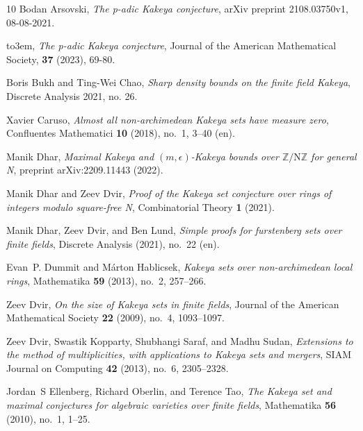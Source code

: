 \documentclass[11pt]{article}
\numberwithin{equation}{section}
\begin{document}
\begin{thebibliography}{10}
\providecommand{\bysame}{\leavevmode\hbox to3em{\hrulefill}\thinspace}
\providecommand{\MR}{\relax\ifhmode\unskip\space\fi MR }
\providecommand{\MRhref}[2]{%
  \href{http://www.ams.org/mathscinet-getitem?mr=#1}{#2}
}
\providecommand{\href}[2]{#2}
Bodan Arsovski, \emph{The p-adic {K}akeya conjecture}, arXiv preprint
  2108.03750v1, 08-08-2021.

\bysame, \emph{The p-adic {K}akeya conjecture}, Journal of the American Mathematical Society, \textbf{37} (2023), 69-80.



Boris Bukh and Ting-Wei Chao, \emph{Sharp density bounds on the finite field
  {K}akeya}, Discrete Analysis 2021, no. 26.

Xavier Caruso, \emph{Almost all non-archimedean {K}akeya sets have measure
  zero}, Confluentes Mathematici \textbf{10} (2018), no.~1, 3--40 (en).

Manik Dhar, \emph{{Maximal Kakeya and $(m,\epsilon)$-Kakeya bounds over
  $\mathbb{Z}/\text{{N}}\mathbb{Z}$ for general N}}, preprint arXiv:2209.11443
  (2022).

Manik Dhar and Zeev Dvir, \emph{Proof of the {K}akeya set conjecture over rings
  of integers modulo square-free {N}}, Combinatorial Theory \textbf{1} (2021).

Manik Dhar, Zeev Dvir, and Ben Lund, \emph{Simple proofs for furstenberg sets
  over finite fields}, Discrete Analysis (2021), no.~22 (en).

Evan~P. Dummit and Márton Hablicsek, \emph{Kakeya sets over non-archimedean
  local rings}, Mathematika \textbf{59} (2013), no.~2, 257–266.

Zeev Dvir, \emph{On the size of {K}akeya sets in finite fields}, Journal of the
  American Mathematical Society \textbf{22} (2009), no.~4, 1093--1097.

Zeev Dvir, Swastik Kopparty, Shubhangi Saraf, and Madhu Sudan, \emph{Extensions
  to the method of multiplicities, with applications to {K}akeya sets and
  mergers}, SIAM Journal on Computing \textbf{42} (2013), no.~6, 2305--2328.

Jordan~S Ellenberg, Richard Oberlin, and Terence Tao, \emph{The {K}akeya set
  and maximal conjectures for algebraic varieties over finite fields},
  Mathematika \textbf{56} (2010), no.~1, 1--25.


\end{thebibliography}
\end{document}

